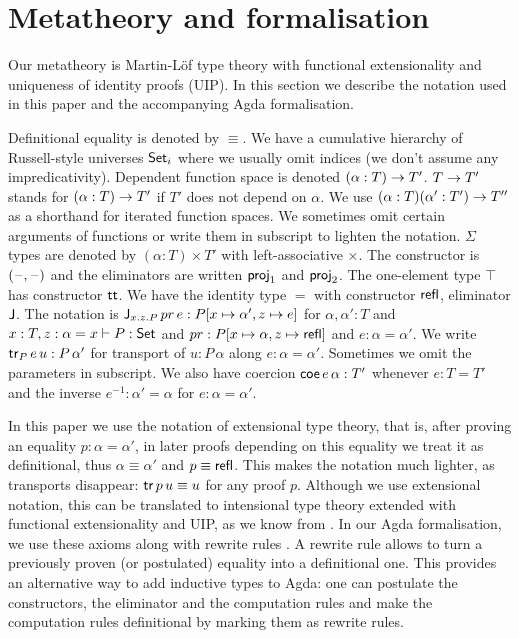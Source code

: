 \documentclass[acmsmall,review,anonymous]{acmart}\settopmatter{printfolios=true,printccs=false,printacmref=false}
\begin{document}

\section{Metatheory and formalisation}
\label{sec:metatheory}

Our metatheory is Martin-L{\"o}f type theory with functional
extensionality and uniqueness of identity proofs (UIP). In this
section we describe the notation used in this paper and the accompanying
Agda formalisation.

Definitional equality is denoted by $\equiv$. We have a cumulative
hierarchy of Russell-style universes $\Set_i$ where we usually omit
indices (we don't assume any impredicativity). Dependent function
space is denoted $(\alpha:T)\ra T'$. $T\ra T'$ stands for
$(\alpha:T)\ra T'$ if $T'$ does not depend on $\alpha$. We use
$(\alpha:T)(\alpha': T')\ra T''$ as a shorthand for iterated function
spaces. We sometimes omit certain arguments of functions or write them
in subscript to lighten the notation.  $\Sigma$ types are denoted by
$(\alpha:T)\times T'$ with left-associative $\times$. The constructor
is $(\blank,\blank)$ and the eliminators are written $\proj_1$ and
$\proj_2$. The one-element type $\top$ has constructor $\tt$. We have
the identity type $=$ with constructor $\refl$, eliminator $\J$. The
notation is $\J_{x.z.P}\,pr\,e:P[x\mapsto\alpha',z\mapsto e]$ for
$\alpha,\alpha':T$ and $x:T, z:\alpha=x \vdash P:\Set$ and
$pr:P[x\mapsto \alpha,z\mapsto\refl]$ and $e :\alpha=\alpha'$. We
write $\tr_P\,e\,u: P\,\alpha'$ for transport of $u : P\,\alpha$ along
$e :\alpha=\alpha'$. Sometimes we omit the parameters in subscript. We
also have coercion $\coe\,e\,\alpha:T'$ whenever $e:T=T'$ and the
inverse $e^{-1}:\alpha'=\alpha$ for $e:\alpha=\alpha'$.

In this paper we use the notation of extensional type theory, that is,
after proving an equality $p : \alpha=\alpha'$, in later proofs
depending on this equality we treat it as definitional, thus
$\alpha\equiv\alpha'$ and $p \equiv \refl$. This makes the notation
much lighter, as transports disappear: $\tr\,p\,u\equiv u$ for any
proof $p$. Although we use extensional notation, this can
be translated to intensional type theory extended with functional
extensionality and UIP, as we know from
\cite{hofmann95conservativity, Oury2005,theo}. In our Agda formalisation, we use these axioms
along with rewrite rules \cite{cockx}. A
rewrite rule allows to turn a previously proven (or postulated)
equality into a definitional one. %
This provides
an alternative way to add inductive types to Agda: one can postulate
the constructors, the eliminator and the computation rules and make
the computation rules definitional by marking them as rewrite rules.
\end{document}
